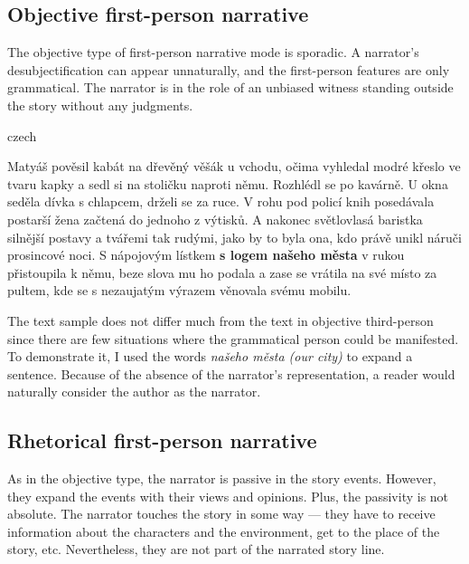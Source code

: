 \subsection{Objective first-person narrative}

The objective type of first-person narrative mode is sporadic. A narrator's desubjectification can appear unnaturally, and the first-person features are only grammatical. The narrator is in the role of an unbiased witness standing outside the story without any judgments. \cite{dolezel-narativni-zpusoby}
\newline

\begin{otherlanguage*}{czech}
\begin{quoting}
Matyáš pověsil kabát na dřevěný věšák u vchodu, očima vyhledal modré křeslo ve tvaru kapky a sedl si na stoličku naproti němu. Rozhlédl se po kavárně. U okna seděla dívka s chlapcem, drželi se za ruce. V rohu pod policí knih posedávala postarší žena začtená do jednoho z výtisků. A nakonec světlovlasá baristka silnější postavy a tvářemi tak rudými, jako by to byla ona, kdo právě unikl náruči prosincové noci. S nápojovým lístkem \textbf{s logem našeho města} v rukou přistoupila k němu, beze slova mu ho podala a zase se vrátila na své místo za pultem, kde se s nezaujatým výrazem věnovala svému mobilu.
\newline
\end{quoting}
\end{otherlanguage*}

The text sample does not differ much from the text in objective third-person since there are few situations where the grammatical person could be manifested. To demonstrate it, I used the words \emph{našeho města (our city)} to expand a sentence. Because of the absence of the narrator's representation, a reader would naturally consider the author as the narrator.

\subsection{Rhetorical first-person narrative}
As in the objective type, the narrator is passive in the story events. However, they expand the events with their views and opinions. Plus, the passivity is not absolute. The narrator touches the story in some way --- they have to receive information about the characters and the environment, get to the place of the story, etc. Nevertheless, they are not part of the narrated story line.\cite{dolezel-narativni-zpusoby}\newline

